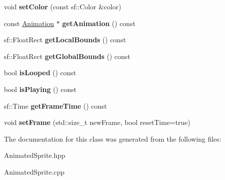 \begin{DoxyCompactItemize}
void {\bfseries set\+Color} (const sf\+::\+Color \&color)
\item 
\mbox{\label{class_animated_sprite_a03bacdbaf638cb6f7987e342980206c2}} 
const \mbox{\hyperlink{class_animation}{Animation}} $\ast$ {\bfseries get\+Animation} () const
\item 
\mbox{\label{class_animated_sprite_ac4c88435c8698f452629c5cd78bfb3c9}} 
sf\+::\+Float\+Rect {\bfseries get\+Local\+Bounds} () const
\item 
\mbox{\label{class_animated_sprite_a86dca0906c53b3e630aaeac2f0085a0e}} 
sf\+::\+Float\+Rect {\bfseries get\+Global\+Bounds} () const
\item 
\mbox{\label{class_animated_sprite_aaf2c2fb0e1487e689af4a6bbeb7e3e85}} 
bool {\bfseries is\+Looped} () const
\item 
\mbox{\label{class_animated_sprite_a55f450add05d45e5369a6ad24f9e438f}} 
bool {\bfseries is\+Playing} () const
\item 
\mbox{\label{class_animated_sprite_a5291f8e24fe2c6e4284bc7ff9499ef77}} 
sf\+::\+Time {\bfseries get\+Frame\+Time} () const
\item 
\mbox{\label{class_animated_sprite_a0b3e38fffdc1d29f46fa08df9ef2a747}} 
void {\bfseries set\+Frame} (std\+::size\+\_\+t new\+Frame, bool reset\+Time=true)
\end{DoxyCompactItemize}


The documentation for this class was generated from the following files\+:\begin{DoxyCompactItemize}
\item 
Animated\+Sprite.\+hpp\item 
Animated\+Sprite.\+cpp\end{DoxyCompactItemize}
